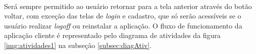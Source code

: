 \begin{figure}[!htb]
    \\
    \vspace{2.5em}
\label{fig:dag}
\end{figure}


Será sempre permitido ao usuário retornar para a tela anterior através do botão voltar, com exceção das telas de \textit{login} e cadastro, que só serão acessíveis se o usuário realizar \textit{logoff} ou reinstalar a aplicação. O fluxo de funcionamento da aplicação cliente é representado pelo diagrama de atividades da figura \ref{img:atividades1} na subseção \ref{subsec:diagAtiv}.

